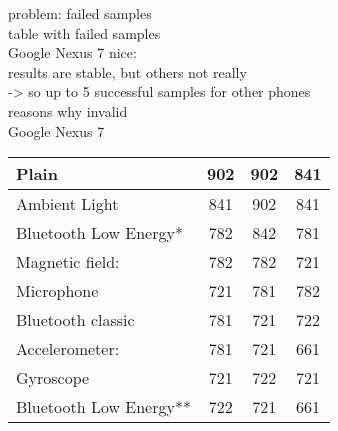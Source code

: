 problem: failed samples\\
	table with failed samples\\
	Google Nexus 7 nice:\\
		results are stable, but others not really\\
			-> so up to 5 successful samples for other phones\\
	reasons why invalid\\
	
	
	Google Nexus 7\\
\begin{table}
    \begin{tabular}{| l | c | c | c |}
    \hline
    Plain                  & 902 & 902 & 841 \\ \hline
    Ambient Light          & 841 & 902 & 841\\ \hline
    Bluetooth Low Energy*  & 782 & 842 & 781 \\ \hline
    Magnetic field:        & 782 & 782 & 721\\ \hline
    Microphone             & 721 & 781 & 782 \\ \hline
    Bluetooth classic      & 781 & 721 & 722 \\ \hline
    Accelerometer:         & 781 & 721 & 661 \\ \hline
    Gyroscope              & 721 & 722 & 721 \\ \hline
    Bluetooth Low Energy** & 722 & 721 & 661 \\ \hline
    \end{tabular}
\end{table}


